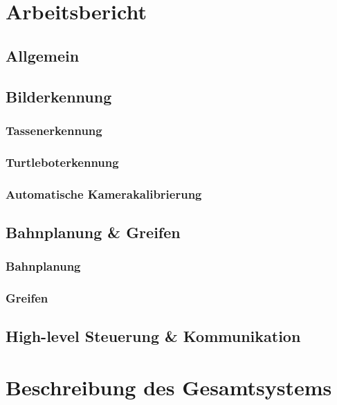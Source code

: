 \documentclass[de,ids]{fziartcl}
\begin{document}
\section{Arbeitsbericht} %
\subsection{Allgemein}
\subsection{Bilderkennung}
\subsubsection{Tassenerkennung}
\subsubsection{Turtleboterkennung}
\subsubsection{Automatische Kamerakalibrierung}
\subsection{Bahnplanung \& Greifen}
\subsubsection{Bahnplanung}
\subsubsection{Greifen}

\subsection{High-level Steuerung \& Kommunikation}

\section{Beschreibung des Gesamtsystems} %
\end{document}
